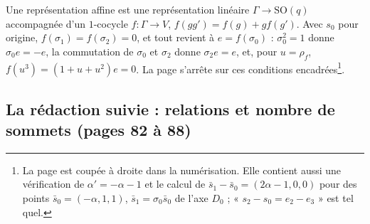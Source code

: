 \documentclass[11pt,a4paper]{article}
\begin{document}
Une représentation affine est une représentation linéaire $\Gamma \to
\mathrm{SO}(q)$ accompagnée d'un $1$-cocycle $f : \Gamma \to V$, $f(gg') = f(g)
+ g f(g')$. Avec $s_0$ pour origine, $f(\sigma_1) = f(\sigma_2) = 0$, et tout
revient à $e = f(\sigma_0)$ : $\sigma_0^2 = 1$ donne $\sigma_0 e = -e$, la
commutation de $\sigma_0$ et $\sigma_2$ donne $\sigma_2 e = e$, et, pour $u =
\rho_f$, $f(u^3) = (1 + u + u^2)e = 0$. La page s'arrête sur ces conditions
encadrées\footnote{La page est coupée à droite dans la numérisation. Elle
contient aussi une vérification de $\alpha' = -\alpha - 1$ et le calcul de $\bar
s_1 - \bar s_0 = (2\alpha - 1, 0, 0)$ pour des points $\bar s_0 = (-\alpha, 1,
1)$, $\bar s_1 = \sigma_0 \bar s_0$ de l'axe $D_0$ ; « $s_2 - s_0 = e_2 - e_3$ »
est tel quel.}.

\subsection*{La rédaction suivie : relations et nombre de sommets (pages 82 à 88)}
\end{document}
